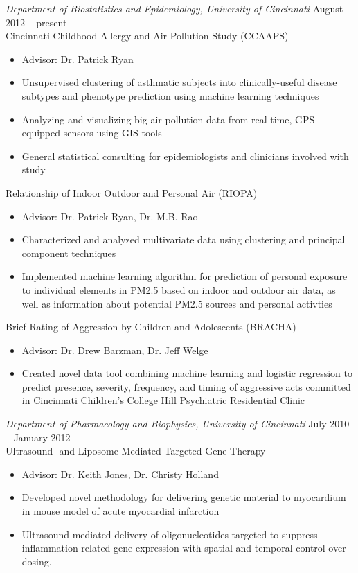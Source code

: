 \documentclass[10pt]{res} %
\begin{document}
\begin{resume}
{\sl Department of Biostatistics and Epidemiology, University of Cincinnati} \hfill August 2012 -- present \\
Cincinnati Childhood Allergy and Air Pollution Study (CCAAPS)
\begin{itemize} \itemsep -2pt %
\item Advisor: Dr. Patrick Ryan 
\item Unsupervised clustering of asthmatic subjects into clinically-useful disease subtypes and phenotype prediction using machine learning techniques
\item Analyzing and visualizing big air pollution data from real-time, GPS equipped sensors using GIS tools
\item General statistical consulting for epidemiologists and clinicians involved with study
\end{itemize} 
\vspace{-6pt} %
Relationship of Indoor Outdoor and Personal Air  (RIOPA)
\begin{itemize} \itemsep -2pt %
\item Advisor: Dr. Patrick Ryan, Dr. M.B. Rao
\item Characterized and analyzed multivariate data using clustering and principal component techniques
\item Implemented machine learning algorithm for prediction of personal exposure to individual elements in PM2.5 based on indoor and outdoor air data, as well as information about potential PM2.5 sources and personal activties
\end{itemize}
\vspace{-6pt} %
Brief Rating of Aggression by Children and Adolescents (BRACHA)
\begin{itemize} \itemsep -2pt
\item Advisor: Dr. Drew Barzman, Dr. Jeff Welge
\item Created novel data tool combining machine learning and logistic regression to predict presence, severity, frequency, and timing of aggressive acts committed in Cincinnati Children's College Hill Psychiatric Residential Clinic
\end{itemize}
 
{\sl Department of Pharmacology and Biophysics, University of Cincinnati} \hfill July 2010 -- January 2012 \\
Ultrasound- and Liposome-Mediated Targeted Gene Therapy
\begin{itemize}\itemsep -2pt
\item Advisor: Dr. Keith Jones, Dr. Christy Holland
\item Developed novel methodology for delivering genetic material to myocardium in mouse model of acute myocardial infarction
\item Ultrasound-mediated delivery of oligonucleotides targeted to suppress inflammation-related gene expression with spatial and temporal control over dosing. 
\end{itemize}


\end{resume}
\end{document}
